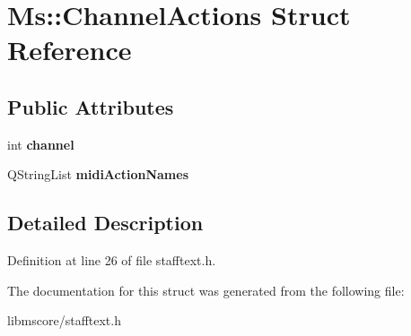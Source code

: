 \hypertarget{struct_ms_1_1_channel_actions}{}\section{Ms\+:\+:Channel\+Actions Struct Reference}
\label{struct_ms_1_1_channel_actions}
\subsection*{Public Attributes}
\begin{DoxyCompactItemize}
\item 
\mbox{\label{struct_ms_1_1_channel_actions_a7a453d89c5e10c0285fc8712a4989d04}} 
int {\bfseries channel}
\item 
\mbox{\label{struct_ms_1_1_channel_actions_ae4a444706e3dd034f82b0857aad7f20a}} 
Q\+String\+List {\bfseries midi\+Action\+Names}
\end{DoxyCompactItemize}


\subsection{Detailed Description}


Definition at line 26 of file stafftext.\+h.



The documentation for this struct was generated from the following file\+:\begin{DoxyCompactItemize}
\item 
libmscore/stafftext.\+h\end{DoxyCompactItemize}
